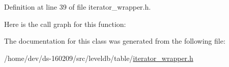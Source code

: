 Definition at line 39 of file iterator\+\_\+wrapper.\+h.



Here is the call graph for this function\+:




The documentation for this class was generated from the following file\+:\begin{DoxyCompactItemize}
\item 
/home/dev/ds-\/160209/src/leveldb/table/\hyperlink{iterator__wrapper_8h}{iterator\+\_\+wrapper.\+h}\end{DoxyCompactItemize}
